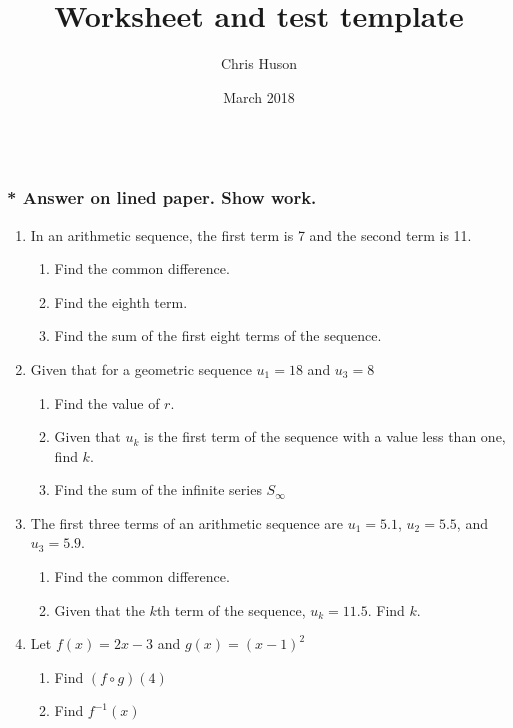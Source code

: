 \documentclass[12pt, oneside]{article}
\title{Worksheet and test template}
\author{Chris Huson}
\date{March 2018}
\begin{document}
\subsubsection*{\\* Answer on lined paper. Show work.}

\begin{enumerate}

\vspace{0.5 cm}


\item In an arithmetic sequence, the first term is 7 and the second term is 11.
\begin{enumerate}
    \item Find the common difference.
    \item Find the eighth term.
    \item Find the sum of the first eight terms of the sequence.
\end{enumerate}

\item Given that for a geometric sequence $u_1=18$ and $u_3=8$
\begin{enumerate}
    \item Find the value of $r$.
    \item Given that $u_k$ is the first term of the sequence with a value less than one, find $k$.
    \item Find the sum of the infinite series $S_\infty$
\end{enumerate}

\item The first three terms of an arithmetic sequence are $u_1=5.1$, $u_2=5.5$, and $u_3=5.9$.
\begin{enumerate}
    \item Find the common difference.
    \item Given that the $k$th term of the sequence, $u_k=11.5$. Find $k$.
\end{enumerate}


\item Let $f(x) = 2x -3$ and $g(x)=(x-1)^2$
\begin{enumerate}
    \item Find $(f \circ g)(4)$
    \item Find $f^{-1}(x)$
\end{enumerate}



\end{enumerate}
\end{document}
